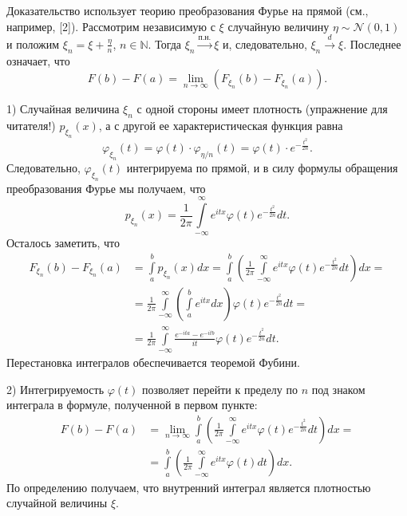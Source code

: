 \begin{proofbox}
    Доказательство использует теорию преобразования Фурье на прямой (см., например, [2]). Рассмотрим независимую с $\xi$ случайную величину $\eta \sim \mathcal{N}(0, 1)$ и положим $\xi_n = \xi + \frac{\eta}{n}$, $n \in \mathbb{N}$. Тогда $\xi_n \xrightarrow{\text{п.н.}} \xi$ и, следовательно, $\xi_n \xrightarrow{d} \xi$. Последнее означает, что
    \begin{equation*}
        F(b) - F(a) = \lim_{n \to \infty} (F_{\xi_n}(b) - F_{\xi_n}(a)).
    \end{equation*}
    
    1) Случайная величина $\xi_n$ с одной стороны имеет плотность (упражнение для читателя!) $p_{\xi_n}(x)$, а с другой ее характеристическая функция равна
    \begin{equation*}
        \varphi_{\xi_n}(t) = \varphi(t) \cdot \varphi_{\eta/n}(t) = \varphi(t) \cdot e^{-\frac{t^2}{2n}}.
    \end{equation*}
    Следовательно, $\varphi_{\xi_n}(t)$ интегрируема по прямой, и в силу формулы обращения преобразования Фурье мы получаем, что
    \begin{equation*}
        p_{\xi_n}(x) = \frac{1}{2\pi} \int\limits_{-\infty}^{\infty} e^{itx} \varphi(t) e^{-\frac{t^2}{2n}} dt.
    \end{equation*}
    Осталось заметить, что
    \begin{align*}
        F_{\xi_n}(b) - F_{\xi_n}(a) &= \int\limits_a^b p_{\xi_n}(x) dx = \int\limits_a^b \left( \frac{1}{2\pi} \int\limits_{-\infty}^{\infty} e^{itx} \varphi(t) e^{-\frac{t^2}{2n}} dt \right) dx = \\
        &= \frac{1}{2\pi} \int\limits_{-\infty}^{\infty} \left( \int\limits_a^b e^{itx} dx \right) \varphi(t) e^{-\frac{t^2}{2n}} dt = \\
        &= \frac{1}{2\pi} \int\limits_{-\infty}^{\infty} \frac{e^{-ita} - e^{-itb}}{it} \varphi(t) e^{-\frac{t^2}{2n}} dt.
    \end{align*}
    Перестановка интегралов обеспечивается теоремой Фубини.
    
    2) Интегрируемость $\varphi(t)$ позволяет перейти к пределу по $n$ под знаком интеграла в формуле, полученной в первом пункте:
    \begin{align*}
        F(b) - F(a) &= \lim_{n \to \infty} \int\limits_a^b \left( \frac{1}{2\pi} \int\limits_{-\infty}^{\infty} e^{itx} \varphi(t) e^{-\frac{t^2}{2n}} dt \right) dx = \\
        &= \int\limits_a^b \left( \frac{1}{2\pi} \int\limits_{-\infty}^{\infty} e^{itx} \varphi(t) dt \right) dx.
    \end{align*}
    По определению получаем, что внутренний интеграл является плотностью случайной величины $\xi$.
\end{proofbox}
